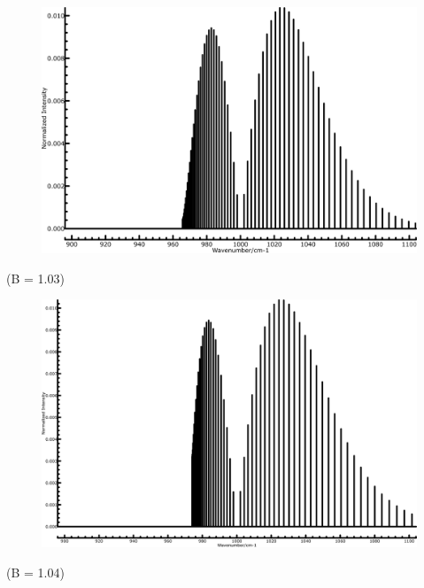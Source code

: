 \begin{center}
	\begin{minipage}{\linewidth}
		\begin{minipage}{0.5\linewidth}
			\begin{figure}[H]
				\centering \includegraphics[width=\linewidth] 						{figures/B103.png}
			\end{figure} 
				\centering(B = 1.03) \\
		\end{minipage}
		\begin{minipage}{0.5\linewidth}
		   \begin{figure}[H]
				\centering \includegraphics[width=\linewidth]	  					{figures/B104.png}
			\end{figure}
				\centering(B = 1.04) \\
		\end{minipage}
	\end{minipage}
\end{center}
